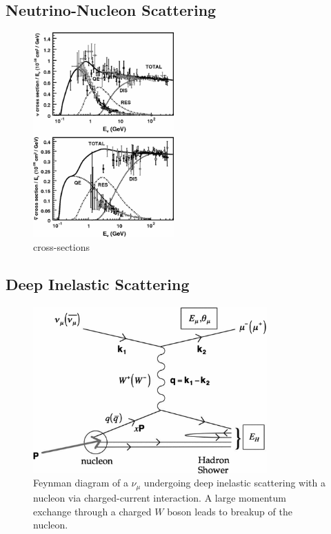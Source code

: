 \documentclass{gatech-thesis}
\begin{document}
\subsection{Neutrino-Nucleon Scattering}


\begin{figure}
  \begin{center}
    \includegraphics[width=0.48\textwidth,keepaspectratio]{neutrino_nucelon_crosssections.png}
  \end{center}
  \caption{cross-sections}
  \label{fig:neutrino_scattering}
\end{figure}

\subsection{Deep Inelastic Scattering}

\begin{figure}[ht]
  \begin{center}
    \includegraphics[width=0.8\textwidth,keepaspectratio]{dis.png}
  \end{center}
  \caption{Feynman diagram of a $\nu_{\mu}$ undergoing deep inelastic scattering with a nucleon via charged-current interaction. A large momentum exchange through a charged $W$ boson leads to breakup of the nucleon.}
  \label{fig:neutrino_scattering}
\end{figure}
\end{document}
